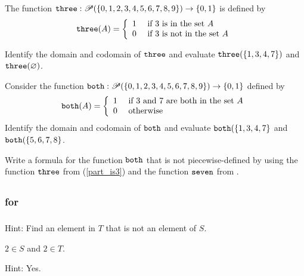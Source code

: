 \begin{exer}[\exerE] %
\label{exer_both_function}
The function $\texttt{three}:\mathscr{P}(\{0,1,2,3,4,5,6,7,8,9\}) \to \{0,1\}$ is defined by 
        $$\texttt{three}(A) = \left\{
        \begin{array}{cl}
        1 & \text{ if 3 is in the set }A \\
        0 & \text{ if 3 is not in the set } A \\
        \end{array}
        \right.$$
        \begin{exerpart}
            \item \label{part_is3} Identify the domain and codomain of $\texttt{three}$ and evaluate $\texttt{three}(\{1,3,4,7\})$ and $\texttt{three}(\varnothing)$. 

            \item Consider the function $\texttt{both}:\mathscr{P}(\{0,1,2,3,4,5,6,7,8,9\}) \to \{0,1\}$ defined by 
                $$\texttt{both}(A) = \left\{
                \begin{array}{cl}
                1 & \text{ if 3 and 7 are both in the set }A \\
                0 & \text{ otherwise} \\
                \end{array}
                \right.$$  Identify the domain and codomain of $\texttt{both}$ and evaluate $\texttt{both}(\{1,3,4,7\}$ and $\texttt{both}(\{5,6,7,8\}$.
            \item Write a formula for the function $\texttt{both}$ that is not piecewise-defined by using the function $\texttt{three}$ from (\ref{part_is3}) and the function $\texttt{seven}$ from .
        \end{exerpart}  
\end{exer}

\subsection{\answers}

\subsubsection{\answers for 
\subsubsets}

\subsubsection*{ \answers}
\begin{apart}
    \item Hint: Find an element in $T$ that is not an element of $S$.
    \item $2 \in S$ and $2 \in T$.
    \item Hint: Yes.
\end{apart}


